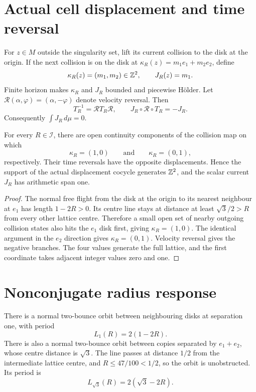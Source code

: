 \section{Actual cell displacement and time reversal}\label{sec:current}
For $z\in M$ outside the singularity set, lift its current collision to the
disk at the origin.  If the next collision is on the disk at
$\kappa_R(z)=m_1e_1+m_2e_2$, define
\[
 \kappa_R(z)=(m_1,m_2)\in\mathbb Z^2,
 \qquad J_R(z)=m_1.
\]
Finite horizon makes $\kappa_R$ and $J_R$ bounded and piecewise H\"older.
Let $\mathscr R(\alpha,\varphi)=(\alpha,-\varphi)$ denote velocity reversal.
Then
\[
 T_R^{-1}=\mathscr R T_R\mathscr R,
 \qquad J_R\circ\mathscr R\circ T_R=-J_R.
\]
Consequently $\int J_R\,d\mu=0$.

\begin{proposition}\label{prop:span}
For every $R\in\mathcal I$, there are open continuity components of the
collision map on which
\[
 \kappa_R=(1,0)
 \qquad\text{and}\qquad
 \kappa_R=(0,1),
\]
respectively.  Their time reversals have the opposite displacements.  Hence the
support of the actual displacement cocycle generates $\mathbb Z^2$, and the scalar
current $J_R$ has arithmetic span one.
\end{proposition}
\begin{proof}
The normal free flight from the disk at the origin to its nearest neighbour at
$e_1$ has length $1-2R>0$.  Its centre line stays at distance at least
$\sqrt3/2>R$ from every other lattice centre.  Therefore a small open set of
nearby outgoing collision states also hits the $e_1$ disk first, giving
$\kappa_R=(1,0)$.  The identical argument in the $e_2$ direction gives
$\kappa_R=(0,1)$.  Velocity reversal gives the negative branches.  The four
values generate the full lattice, and the first coordinate takes adjacent
integer values zero and one.
\end{proof}

\section{Nonconjugate radius response}\label{sec:nonconjugacy}
There is a normal two-bounce orbit between neighbouring disks at separation
one, with period
\[
 L_1(R)=2(1-2R).
\]
There is also a normal two-bounce orbit between copies separated by
$e_1+e_2$, whose centre distance is $\sqrt3$.  The line passes at distance
$1/2$ from the intermediate lattice centre, and
$R\le47/100<1/2$, so the orbit is unobstructed.  Its period is
\[
 L_{\sqrt3}(R)=2(\sqrt3-2R).
\]

